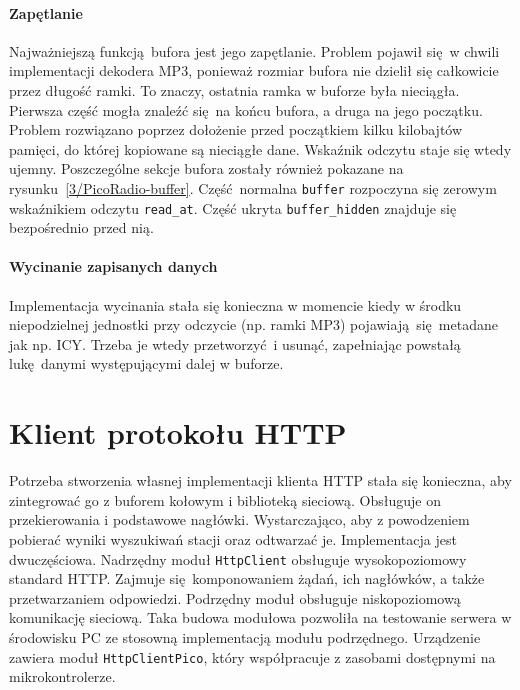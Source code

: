 \documentclass[12pt]{report}
\begin{document}
		\paragraph{Zapętlanie}
			Najważniejszą funkcją bufora jest jego zapętlanie. Problem pojawił się w chwili implementacji dekodera MP3, ponieważ rozmiar bufora nie dzielił się całkowicie przez długość ramki. To znaczy, ostatnia ramka w buforze była nieciągła. Pierwsza część mogła znaleźć się na końcu bufora, a druga na jego początku. Problem rozwiązano poprzez dołożenie przed początkiem kilku kilobajtów pamięci, do której kopiowane są nieciągłe dane. Wskaźnik odczytu staje się wtedy ujemny. Poszczególne sekcje bufora zostały również pokazane na rysunku~\ref{3/PicoRadio-buffer}. Część normalna \lstinline|buffer| rozpoczyna się zerowym wskaźnikiem odczytu \lstinline|read_at|. Część ukryta \lstinline|buffer_hidden| znajduje się bezpośrednio przed nią.
		
		\paragraph{Wycinanie zapisanych danych}
			Implementacja wycinania stała się konieczna w momencie kiedy w środku niepodzielnej jednostki przy odczycie (np. ramki MP3) pojawiają się metadane jak np. ICY. Trzeba je wtedy przetworzyć i usunąć, zapełniając powstałą lukę danymi występującymi dalej w buforze.
	
	\section{Klient protokołu HTTP}
		Potrzeba stworzenia własnej implementacji klienta HTTP stała się konieczna, aby zintegrować go z buforem kołowym i biblioteką sieciową. Obsługuje on przekierowania i podstawowe nagłówki. Wystarczająco, aby z powodzeniem pobierać wyniki wyszukiwań stacji oraz odtwarzać je. Implementacja jest dwuczęściowa. Nadrzędny moduł \lstinline|HttpClient| obsługuje wysokopoziomowy standard HTTP. Zajmuje się komponowaniem żądań, ich nagłówków, a także przetwarzaniem odpowiedzi. Podrzędny moduł obsługuje niskopoziomową komunikację sieciową. Taka budowa modułowa pozwoliła na testowanie serwera w środowisku PC ze stosowną implementacją modułu podrzędnego. Urządzenie zawiera moduł \lstinline|HttpClientPico|, który współpracuje z zasobami dostępnymi na mikrokontrolerze.
		$ $\\
		
\end{document}
